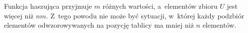 \exercise %
\exercise %
Funkcja haszująca przyjmuje $m$ różnych wartości, a~elementów zbioru $U$ jest więcej niż $nm$. Z~tego powodu nie może być sytuacji, w~której każdy podzbiór elementów odwzorowywanych na pozycję tablicy ma mniej niż $n$ elementów.


\exercise %
\exercise %
\exercise %
\exercise %
\exercise %
\exercise %


\exercise %
\exercise %
\exercise %
\exercise %
\exercise %


\exercise %

\problems


\subproblem %
\subproblem %
\subproblem %
\subproblem %


\subproblem %
\subproblem %
\subproblem %
\subproblem %
\subproblem %


\subproblem %
\subproblem %


\subproblem %
\subproblem %
\subproblem %

\endinput
